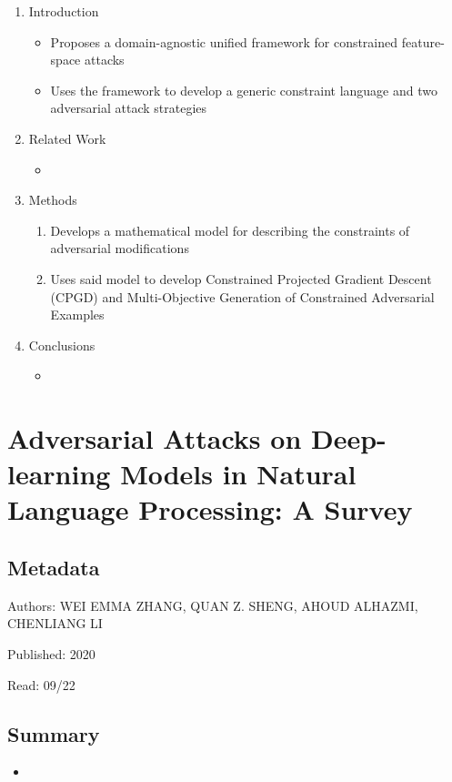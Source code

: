 \documentclass{article}
\begin{document}
\begin{enumerate}
	\item Introduction
	\begin{itemize}
		\item Proposes a domain-agnostic unified framework for constrained feature-space attacks
		\item Uses the framework to develop a generic constraint language and two adversarial attack strategies
	\end{itemize}
	\item Related Work
	\begin{itemize}
		\item 
	\end{itemize}
	\item Methods
	\begin{enumerate}
		\item Develops a mathematical model for describing the constraints of adversarial modifications
		\item Uses said model to develop Constrained Projected Gradient Descent (CPGD) and Multi-Objective Generation of Constrained Adversarial Examples
	\end{enumerate}
	\item Conclusions
	\begin{itemize}
		\item 
	\end{itemize}
\end{enumerate}
\pagebreak


\section*{Adversarial Attacks on Deep-learning Models in Natural Language Processing: A Survey}

\subsection*{Metadata}

\noindent Authors: WEI EMMA ZHANG, QUAN Z. SHENG, AHOUD ALHAZMI, CHENLIANG LI

\noindent Published: 2020

\noindent Read: 09/22

\subsection*{Summary}
\begin{itemize}
	\item
\end{itemize}
\end{document}
